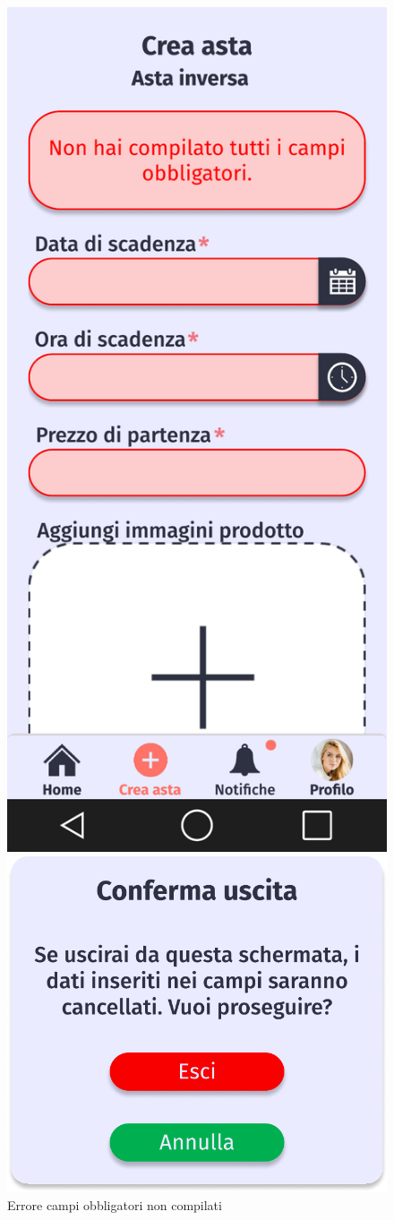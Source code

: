         \begin{figure}[!htb]
            \begin{minipage}{0.32\textwidth}
                \centering
                \includegraphics[width=.7\linewidth]{Immagini/Frames/Errori/E11.pdf}
                \caption{Errore campi obbligatori non compilati}
            \end{minipage}\hfill
            \begin{minipage}{0.32\textwidth}
                \centering
                \includegraphics[width=.7\linewidth]{Immagini/Frames/Popup/P6.pdf}

\end{minipage}
\end{figure}
